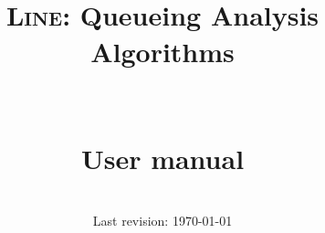\documentclass[11pt, openany, dvipsnames]{book}
\title{~\\~\\~\\~\\~\\~\\\textsc{Line}: Queueing Analysis Algorithms\\~\\~\\User manual}
\date{~\\\vfill Last revision: \today}
\author{}
\newcommand{\RED}[1]{\textcolor{red}{#1}}
\newcommand{\MAGENTA}[1]{\textcolor{magenta}{#1}}
\newcommand{\ORANGE}[1]{\textcolor{orange}{#1}}
\newcommand{\GREEN}[1]{\textcolor{green}{#1}}
\begin{document}

\newcommand{\Java}[1]{\ifbool{isJava}{\ORANGE{#1}}{}}
\newcommand{\Python}[1]{\ifbool{isPython}{\RED{#1}}{}}
\newcommand{\Kotlin}[1]{\ifbool{isKotlin}{\GREEN{#1}}{}}
\newcommand{\Matlab}[1]{\ifbool{isMatlab}{\MAGENTA{#1}}{}}


\newenvironment{PYTHON}{%
  \ifthenelse{\boolean{isPython}}{\color{red}}{\color{black}}%
}{}

\newenvironment{MATLAB}{%
  \ifthenelse{\boolean{isMatlab}}{\color{magenta}}{\color{black}}%
}{}

\newenvironment{JAVA}{%
  \ifthenelse{\boolean{isJava}}{\color{orange}}{\color{black}}%
}{}

\newenvironment{KOTLIN}{%
  \ifthenelse{\boolean{isKotlin}}{\color{green}}{\color{black}}%
}{}


\maketitle
 \tableofcontents
\end{document}
